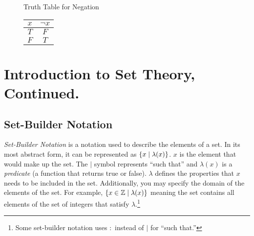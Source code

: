 \begin{figure}[H]
    \centering
    Truth Table for Negation

    \begin{tabular}{cc}
        \(x\) & \(\lnot x\) \\
        \hline
        \(T\) & \(F\) \\
        \(F\) & \(T\) 
    \end{tabular}
\end{figure}

\section{Introduction to Set Theory, Continued.}

\subsection{Set-Builder Notation}

\emph{Set-Builder Notation} is a notation used to describe the elements of a set. In its most abstract form, it can be represented as \(\{x\mid\lambda(x)\}\).
\(x\) is the element that would make up the set. The \(\mid\) symbol represents ``such that'' and \(\lambda(x)\) is a \emph{predicate} (a function that returns true or false).
\(\lambda\) defines the properties that \(x\) needs to be included in the set. Additionally, you may specify the domain of the elements of the set. For example, 
\(\{x\in\mathbb{Z}\mid\lambda(x)\}\) meaning the set contains all elements of the set of integers that satisfy \(\lambda\).\footnote{Some set-builder notation
uses \(:\) instead of \(\mid\) for ``such that.''}

